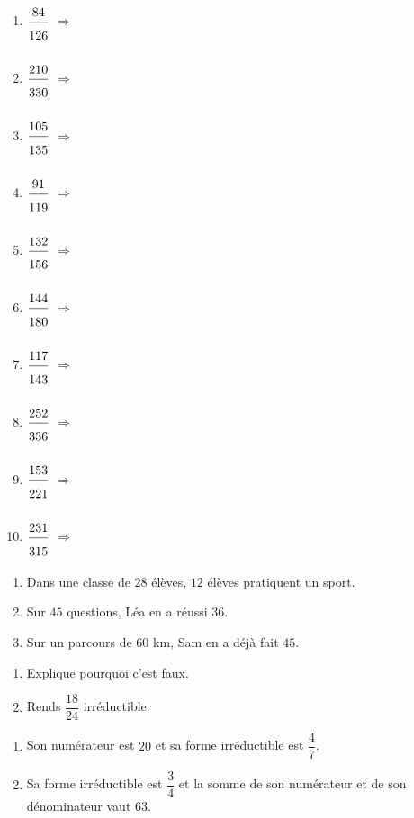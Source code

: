 \begin{enumerate}[leftmargin=*,align=parleft, label=\alph*), itemsep=9pt]
\item $\FA{84}{126}$ \quad $\Longrightarrow$
\item $\FA{210}{330}$ \quad $\Longrightarrow$
\item $\FA{105}{135}$ \quad $\Longrightarrow$
\item $\FA{91}{119}$ \quad $\Longrightarrow$
\item $\FA{132}{156}$ \quad $\Longrightarrow$
\item $\FA{144}{180}$ \quad $\Longrightarrow$
\item $\FA{117}{143}$ \quad $\Longrightarrow$
\item $\FA{252}{336}$ \quad $\Longrightarrow$
\item $\FA{153}{221}$ \quad $\Longrightarrow$
\item $\FA{231}{315}$ \quad $\Longrightarrow$
\end{enumerate}
 

\bigskip
{}
 
\begin{enumerate}[leftmargin=*,align=parleft, label=\alph*), itemsep=9pt]
\item Dans une classe de $28$ élèves, $12$ élèves pratiquent un sport.
\item Sur $45$ questions, Léa en a réussi $36$.
\item Sur un parcours de $60$ km, Sam en a déjà fait $45$.
\end{enumerate}
 
\bigskip
{}
 
\begin{enumerate}[leftmargin=*,align=parleft, label=\alph*), itemsep=9pt]
\item Explique pourquoi c'est faux.
\item Rends $\dfrac{18}{24}$ irréductible.
\end{enumerate}
 
\bigskip
{}
 
\begin{enumerate}[leftmargin=*,align=parleft, label=\alph*), itemsep=9pt]
\item Son numérateur est $20$ et sa forme irréductible est $\dfrac{4}{7}$.
\item Sa forme irréductible est $\dfrac{3}{4}$ et la somme de son numérateur et de son dénominateur vaut $63$.
\end{enumerate}

